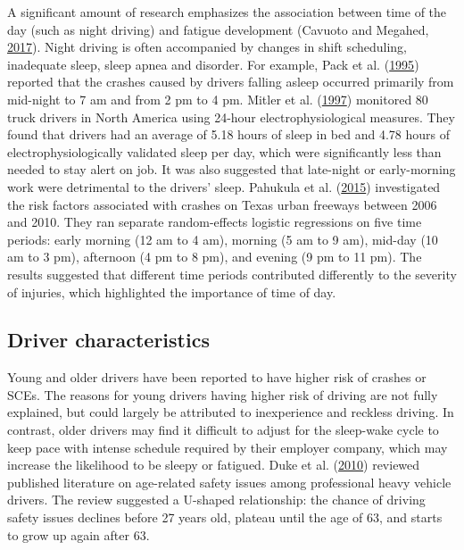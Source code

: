 \documentclass[12pt]{book}
\numberwithin{equation}{chapter}
\begin{document}
A significant amount of research emphasizes the association between time of the day (such as night driving) and fatigue development (Cavuoto and Megahed, \protect\hyperlink{ref-cavuoto2017understanding}{2017}). Night driving is often accompanied by changes in shift scheduling, inadequate sleep, sleep apnea and disorder. For example, Pack et al. (\protect\hyperlink{ref-pack1995characteristics}{1995}) reported that the crashes caused by drivers falling asleep occurred primarily from mid-night to 7 am and from 2 pm to 4 pm. Mitler et al. (\protect\hyperlink{ref-mitler1997sleep}{1997}) monitored 80 truck drivers in North America using 24-hour electrophysiological measures. They found that drivers had an average of 5.18 hours of sleep in bed and 4.78 hours of electrophysiologically validated sleep per day, which were significantly less than needed to stay alert on job. It was also suggested that late-night or early-morning work were detrimental to the drivers' sleep. Pahukula et al. (\protect\hyperlink{ref-pahukula2015time}{2015}) investigated the risk factors associated with crashes on Texas urban freeways between 2006 and 2010. They ran separate random-effects logistic regressions on five time periods: early morning (12 am to 4 am), morning (5 am to 9 am), mid-day (10 am to 3 pm), afternoon (4 pm to 8 pm), and evening (9 pm to 11 pm). The results suggested that different time periods contributed differently to the severity of injuries, which highlighted the importance of time of day.

\hypertarget{driver-characteristics}{%
\subsection{Driver characteristics}\label{driver-characteristics}}

Young and older drivers have been reported to have higher risk of crashes or SCEs. The reasons for young drivers having higher risk of driving are not fully explained, but could largely be attributed to inexperience and reckless driving. In contrast, older drivers may find it difficult to adjust for the sleep-wake cycle to keep pace with intense schedule required by their employer company, which may increase the likelihood to be sleepy or fatigued. Duke et al. (\protect\hyperlink{ref-duke2010age}{2010}) reviewed published literature on age-related safety issues among professional heavy vehicle drivers. The review suggested a U-shaped relationship: the chance of driving safety issues declines before 27 years old, plateau until the age of 63, and starts to grow up again after 63.
\end{document}
